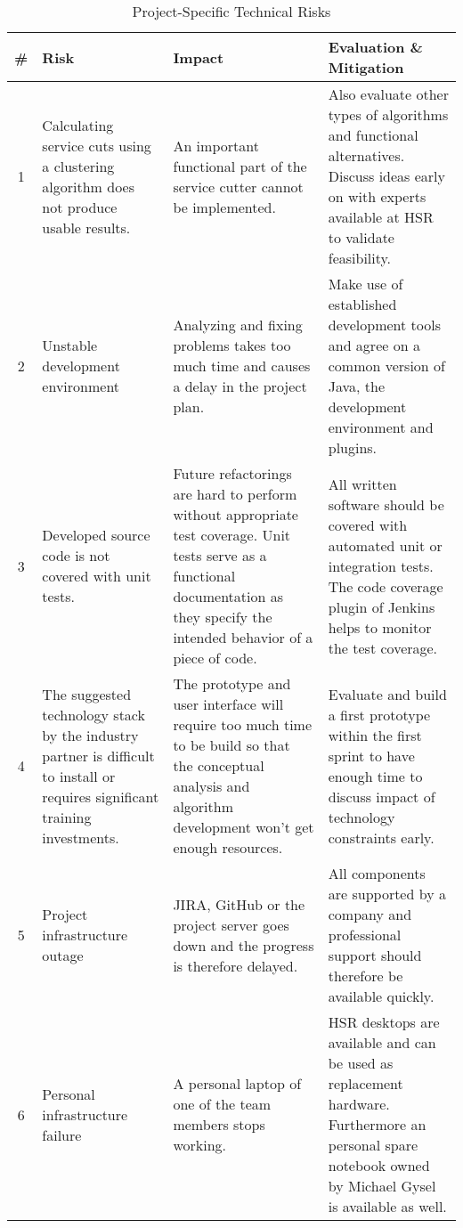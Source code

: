 \begin{table}[H]
\begin{tabular}{|c|p{80pt} p{140pt} p{140pt}|}
	\hline \# & Risk & Impact & Evaluation \& Mitigation \\ 
	\hline 1 & Calculating service cuts using a clustering algorithm does not produce usable results. & An important functional part of the service cutter cannot be implemented. & Also evaluate other types of algorithms and functional alternatives. Discuss ideas early on with experts available at \gls{HSR} to validate feasibility. \\ 
	2 & Unstable development environment & Analyzing and fixing problems takes too much time and causes a delay in the project plan. & Make use of established development tools and agree on a common version of Java, the development environment and plugins. \\
	3 & Developed source code is not covered with unit tests. & Future refactorings are hard to perform without appropriate test coverage. Unit tests serve as a functional documentation as they specify the intended behavior of a piece of code. & All written software should be covered with automated unit or integration tests. The code coverage plugin of Jenkins helps to monitor the test coverage. \\
	4 & The suggested technology stack by the industry partner is difficult to install or requires significant training investments. & The prototype and user interface will require too much time to be build so that the conceptual analysis and algorithm development won't get enough resources. & Evaluate and build a first prototype within the first sprint to have enough time to discuss impact of technology constraints early.\\
	5 & Project infrastructure outage & JIRA, GitHub or the project server goes down and the progress is therefore delayed.  & All components are supported by a company and professional support should therefore be available quickly.  \\ 
	6 & Personal infrastructure failure & A personal laptop of one of the team members stops working. & HSR desktops are available and can be used as replacement hardware. Furthermore an personal spare notebook owned by Michael Gysel is available as well.  \\ 

	\hline
\end{tabular}
\caption{Project-Specific Technical Risks}
\label{tab:projtechnicalrisks}
\end{table}

